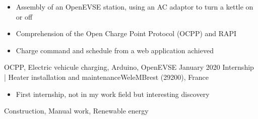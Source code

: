 \begin{experiences}
{\begin{itemize}
                        \item Assembly of an OpenEVSE station, using an AC adaptor to turn a kettle on or off
                        \item Comprehension of the Open Charge Point Protocol (OCPP) and RAPI               
                        \item Charge command and schedule from a web application achieved
                      \end{itemize}
                    }
                    {OCPP, Electric vehicule charging, Arduino, OpenEVSE}
  \emptySeparator
    \experience
    {January 2020}     {Internship | Heater installation and maintenance}{WeleM}{Brest (29200), France}
    {}    {
                      \begin{itemize}
                        \item First internship, not in my work field but interesting discovery
                      \end{itemize}
                    }
                    {Construction, Manual work, Renewable energy}
  \emptySeparator
\end{experiences}
